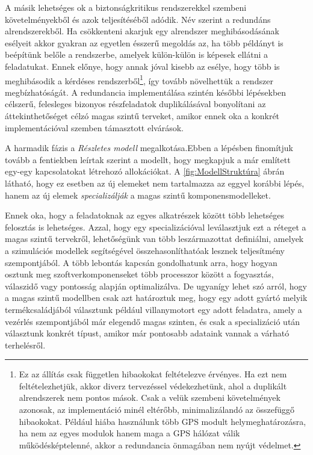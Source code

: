         A másik lehetséges ok a biztonságkritikus rendszerekkel szembeni követelményekből és azok teljesítéséből adódik. Név szerint a redundáns alrendszerekből. Ha csökkenteni akarjuk egy alrendszer meghibásodásának esélyeit akkor gyakran az egyetlen ésszerű megoldás az, ha több példányt is beépítünk belőle a rendszerbe, amelyek külön-külön is képesek ellátni a feladatukat.
        Ennek előnye, hogy annak jóval kisebb az esélye, hogy több is meghibásodik a kérdéses rendszerből\footnote{Ez az állítás csak független hibaokokat feltételezve érvényes. Ha ezt nem feltételezhetjük, akkor diverz tervezéssel védekezhetünk, ahol a duplikált alrendszerek nem pontos mások. Csak a velük szembeni követelmények azonosak, az implementáció minél eltérőbb, minimalizálandó az összefüggő hibaokokat. Például hiába használunk több GPS modult helymeghatározásra, ha nem az egyes modulok hanem maga a GPS hálózat válik működésképtelenné, akkor a redundancia önmagában nem nyújt védelmet.}, így tovább növelhettük a rendszer megbízhatóságát.
        A redundancia implementálása szintén későbbi lépésekben célszerű, felesleges bizonyos részfeladatok duplikálásával bonyolítani az áttekinthetőséget célzó magas szintű terveket, amikor ennek oka a konkrét implementációval szemben támasztott elvárások.

        A harmadik fázis a \emph{Részletes modell} megalkotása.Ebben a lépésben finomítjuk tovább a fentiekben leírtak szerint a modellt, hogy megkapjuk a már említett egy-egy kapcsolatokat létrehozó allokációkat.
        A \ref{fig:ModellStruktúra} ábrán látható, hogy ez esetben az új elemeket nem tartalmazza az eggyel korábbi lépés, hanem az új elemek \emph{specializálják} a magas szintű komponensmodelleket.
        
        Ennek oka, hogy a feladatoknak az egyes alkatrészek között több lehetséges felosztás is lehetséges. Azzal, hogy egy specializációval leválasztjuk ezt a réteget a magas szintű tervekről, lehetőségünk van több leszármazottat definiálni, amelyek a szimulációs modellek segítségével összehasonlíthatóak lesznek teljesítmény szempontjából.
        A több lebontás kapcsán gondolhatunk arra, hogy hogyan osztunk meg szoftverkomponenseket több processzor között a fogyasztás, válaszidő vagy pontosság alapján optimalizálva. De ugyanígy lehet szó arról, hogy a magas szintű modellben csak azt határoztuk meg, hogy egy adott gyártó melyik termékcsaládjából választunk például villanymotort egy adott feladatra, amely a vezérlés szempontjából már elegendő magas szinten, és csak a specializáció után választunk konkrét típust, amikor már pontosabb adataink vannak a várható terhelésről.

